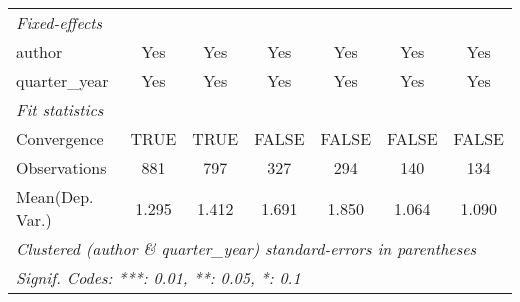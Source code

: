 \begin{tabular}{lcccccc}
   \midrule
   \emph{Fixed-effects}\\
   author                                & Yes          & Yes          & Yes          & Yes           & Yes        & Yes\\  
   quarter\_year                         & Yes          & Yes          & Yes          & Yes           & Yes        & Yes\\  
   \midrule
   \emph{Fit statistics}\\
   Convergence                           &TRUE          & TRUE         & FALSE        & FALSE         & FALSE      & FALSE\\  
   Observations                          & 881          & 797          & 327          & 294           & 140        & 134\\  
Mean(Dep. Var.) & 1.295 & 1.412 & 1.691 & 1.850 & 1.064 & 1.090 \\
   \midrule \midrule
   \multicolumn{7}{l}{\emph{Clustered (author \& quarter\_year) standard-errors in parentheses}}\\
   \multicolumn{7}{l}{\emph{Signif. Codes: ***: 0.01, **: 0.05, *: 0.1}}\\
\end{tabular}
\par\endgroup
